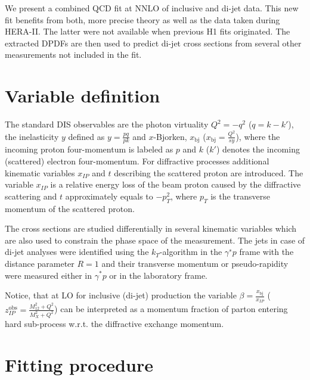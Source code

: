 \documentclass{PoS}
\newcommand{\IP}{I\!\!P}
\begin{document}
We present a combined QCD fit at NNLO of inclusive and di-jet data.
This new fit benefits from both, more precise theory as well as the data taken during HERA-II. The latter were not available when previous H1 fits originated.
The extracted DPDFs are then used to predict di-jet cross sections from several other measurements not included in the fit. 


\section{Variable definition}
The standard DIS observables are the photon virtuality $Q^2 = -q^2$ ($q = k - k'$), the inelasticity $y$ defined as $y = \frac{pq}{pk}$ and $x$-Bjorken, $x_\mathrm{bj}$ ($x_\mathrm{bj}=\frac{Q^2}{sy}$), where the incoming proton four-momentum is labeled as $p$ and $k$ ($k'$) denotes the incoming (scattered) electron four-momentum. 
For diffractive processes additional kinematic variables $x_{\IP}$ and  $t$ describing the scattered proton are introduced.
The variable $x_{\IP}$ is a relative energy loss of the beam proton caused by the diffractive scattering and $t$ approximately equals to  $-p_T^2$, where $p_T$ is the transverse momentum of the scattered proton.

The cross sections are studied differentially in several kinematic variables which are also used to constrain the phase space of the measurement.
The jets in case of di-jet analyses were identified using the $k_T$-algorithm in the $\gamma^{∗}p$ frame with the distance parameter $R = 1$ and their transverse momentum or pseudo-rapidity were measured either in $\gamma^{*}p$ or in the laboratory frame.

Notice, that at LO for inclusive (di-jet) production the variable $\beta = \frac{x_\mathrm{bj}}{x_{\IP}}$ ($z^\mathrm{obs}_{\IP} = \frac{M_{12}^2 + Q^2}{M_X^2 + Q^2}$) can be interpreted as a momentum fraction of parton entering hard sub-process w.r.t. the diffractive exchange momentum.



\section{Fitting procedure}
\end{document}
